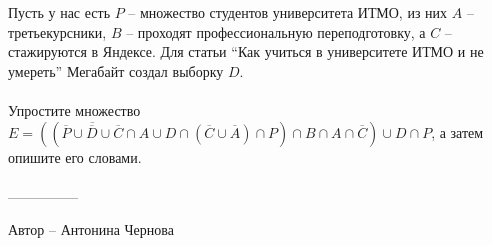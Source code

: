 \question
Пусть у нас есть $P$ -- множество студентов университета ИТМО, из них $A$ -- третьекурсники, $B$ -- проходят профессиональную переподготовку, а $C$ -- стажируются в Яндексе. Для статьи “Как учиться в университете ИТМО и не умереть” Мегабайт создал выборку $D$.
\\
\\
Упростите множество $E = ((\overline{\overline{P} \cup \overline{D}\cup \overline{C}}\cap A \cup D\cap (\overline{C}\cup \overline{A}) \cap P )\cap B \cap A \cap \overline{C})\cup D \cap P$, а затем опишите его словами.
\\
\\
---------------

Автор -- Антонина Чернова